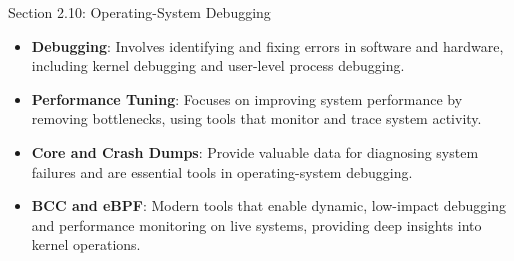 \begin{notes}{Section 2.10: Operating-System Debugging}
\begin{highlight}
    \end{highlight}
    
    \begin{highlight}
    
    \begin{itemize}
        \item \textbf{Debugging}: Involves identifying and fixing errors in software and hardware, including kernel debugging and user-level process debugging.
        \item \textbf{Performance Tuning}: Focuses on improving system performance by removing bottlenecks, using tools that monitor and trace system activity.
        \item \textbf{Core and Crash Dumps}: Provide valuable data for diagnosing system failures and are essential tools in operating-system debugging.
        \item \textbf{BCC and eBPF}: Modern tools that enable dynamic, low-impact debugging and performance monitoring on live systems, providing deep insights into kernel operations.
    \end{itemize}
    
    \end{highlight}
\end{notes}